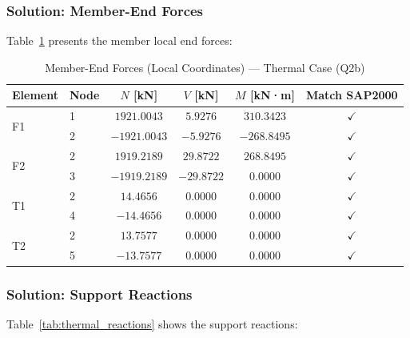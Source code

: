 \documentclass[12pt,a4paper]{article}
\begin{document}
\subsubsection{Solution: Member-End Forces}

Table~\ref{tab:thermal_member_forces} presents the member local end forces:

\begin{table}[H]
    \centering
    \caption{Member-End Forces (Local Coordinates) --- Thermal Case (Q2b)}
    \label{tab:thermal_member_forces}
    \begin{tabular}{llcccc}
        \toprule
        \textbf{Element} & \textbf{Node} & \textbf{$N$ [kN]} & \textbf{$V$ [kN]} & \textbf{$M$ [kN·m]} & \textbf{Match SAP2000} \\
        \midrule
        \multirow{2}{*}{F1} & 1 & $1921.0043$  & $5.9276$   & $310.3423$  & $\checkmark$ \\
                            & 2 & $-1921.0043$ & $-5.9276$  & $-268.8495$ & $\checkmark$ \\
        \midrule
        \multirow{2}{*}{F2} & 2 & $1919.2189$  & $29.8722$  & $268.8495$  & $\checkmark$ \\
                            & 3 & $-1919.2189$ & $-29.8722$ & $0.0000$    & $\checkmark$ \\
        \midrule
        \multirow{2}{*}{T1} & 2 & $14.4656$    & $0.0000$   & $0.0000$    & $\checkmark$ \\
                            & 4 & $-14.4656$   & $0.0000$   & $0.0000$    & $\checkmark$ \\
        \midrule
        \multirow{2}{*}{T2} & 2 & $13.7577$    & $0.0000$   & $0.0000$    & $\checkmark$ \\
                            & 5 & $-13.7577$   & $0.0000$   & $0.0000$    & $\checkmark$ \\
        \bottomrule
    \end{tabular}
\end{table}

\subsubsection{Solution: Support Reactions}

Table~\ref{tab:thermal_reactions} shows the support reactions:
\end{document}
